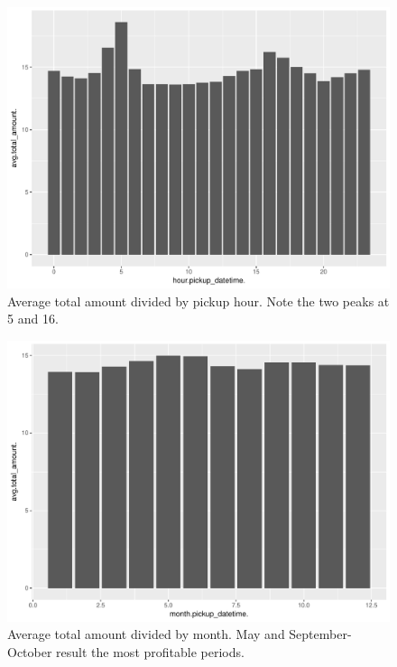 \documentclass{acm_proc_article-sp-sigmod09}
\begin{document}
\begin{figure}
	\centering
	\includegraphics[width=1\columnwidth]{resources/base_plots/avg_total_amount_by_pickup_hour.pdf}
	\caption{Average total amount divided by pickup hour. Note the two peaks at 5 and 16.}
	\label{fig:totalAmountByHour}
\end{figure}

\begin{figure}
	\centering
	\includegraphics[width=1\columnwidth]{resources/base_plots/avg_total_amount_by_month.pdf}
	\caption{Average total amount divided by month. May and September-October result the most profitable periods.}
	\label{fig:totalAmountByMonth}
\end{figure}
\end{document}
